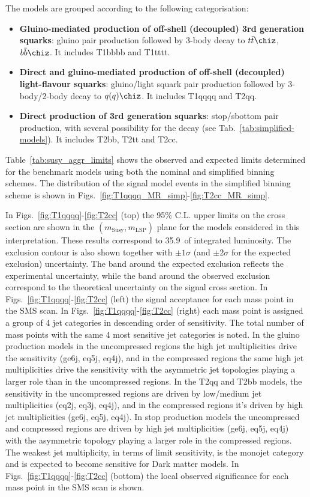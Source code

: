 The models are grouped according to the following categorisation:
\begin{itemize}
\item \textbf{Gluino-mediated production of off-shell (decoupled) 3rd
    generation squarks}: gluino pair production followed by 3-body
  decay to $t\bar{t}\chiz$,$b\bar{b}\chiz$.  It includes T1bbbb and
  T1tttt.
\item \textbf{Direct and gluino-mediated production of off-shell
    (decoupled) light-flavour squarks}: gluino/light squark pair
  production followed by 3-body/2-body decay to $q(q)\chiz$. It
  includes T1qqqq and T2qq.
\item \textbf{Direct production of 3rd generation squarks}:
  stop/sbottom pair production, with several possibility for the decay
  (see Tab.~\ref{tab:simplified-models}). It includes T2bb, T2tt and
  T2cc.
\end{itemize}

Table~\ref{tab:susy_aggr_limits} shows the observed and expected limits
determined for the benchmark models using both the nominal and
simplified binning schemes. 
The distribution of the signal model
events in the simplified binning scheme is shown in
Figs.~\ref{fig:T1qqqq_MR_simp}-\ref{fig:T2cc_MR_simp}.

In Figs.~\ref{fig:T1qqqq}-\ref{fig:T2cc} (top) the 95\% C.L. upper
limits on the cross section are shown in the
$(m_{\mathrm{Susy}},m_{\mathrm{LSP}})$ plane for the models considered
in this interpretation. These results correspond to 35.9~\ifb of
integrated luminosity. The exclusion contour is also shown together
with $\pm1\sigma$ (and $\pm2\sigma$ for the expected exclusion)
uncertainty.  The band around the expected exclusion reflects the
experimental uncertainty, while the band around the observed exclusion
correspond to the theoretical uncertainty on the signal cross
section. In Figs.~\ref{fig:T1qqqq}-\ref{fig:T2cc} (left) the signal
acceptance for each mass point in the SMS scan. In
Figs.~\ref{fig:T1qqqq}-\ref{fig:T2cc} (right) each mass point is
assigned a group of 4 jet categories in descending order of
sensitivity. The total number of mass points with the same 4 most
sensitive jet categories is noted. In the gluino production models in
the uncompressed regions the high jet multiplicities drive the
sensitivity (ge6j, eq5j, eq4j), and in the compressed regions the same
high jet multiplicities drive the sensitivity with the asymmetric jet
topologies playing a larger role than in the uncompressed regions. In
the T2qq and T2bb models, the sensitivity in the uncompressed regions
are driven by low/medium jet multiplicities (eq2j, eq3j, eq4j), and in
the compressed regions it's driven by high jet multiplicities (ge6j,
eq5j, eq4j). In stop production models the uncompressed and compressed
regions are driven by high jet multiplicities (ge6j, eq5j, eq4j) with
the asymmetric topology playing a larger role in the compressed
regions.  The weakest jet multiplicity, in terms of limit sensitivity,
is the monojet category and is expected to become sensitive for Dark
matter models. In Figs.~\ref{fig:T1qqqq}-\ref{fig:T2cc} (bottom) the
local observed significance for each mass point in the SMS scan is
shown.

